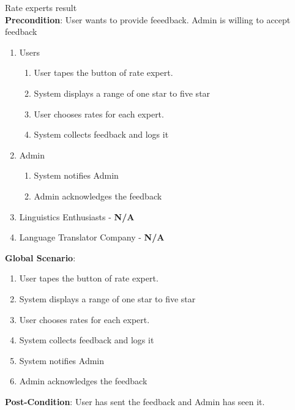 \item Rate experts result  \\
\textbf{Precondition}: User wants to provide feeedback. Admin is willing to accept feedback
	\begin{enumerate}[{\bf VP1.}]
		\item Users
		\begin{enumerate}[{\bf 1.}]
			\item User tapes the button of rate expert.
			\item System displays a range of one star to five star
			\item User chooses rates for each expert.
			\item System collects feedback and logs it
		\end{enumerate}
		\item Admin
		\begin{enumerate}[{\bf 1.}]
			\item System notifies Admin
			\item Admin acknowledges the feedback
		\end{enumerate}
		\item Linguistics Enthusiasts - \textbf{N/A}
		\item Language Translator Company - \textbf{N/A}
	\end{enumerate}
\textbf{Global Scenario}:
\begin{enumerate}[{\bf 1.}]
	\item User tapes the button of rate expert.
	\item System displays a range of one star to five star
	\item User chooses rates for each expert.
	\item System collects feedback and logs it
	\item System notifies Admin
	\item Admin acknowledges the feedback
\end{enumerate}
\textbf{Post-Condition}: User has sent the feedback and Admin has seen it.